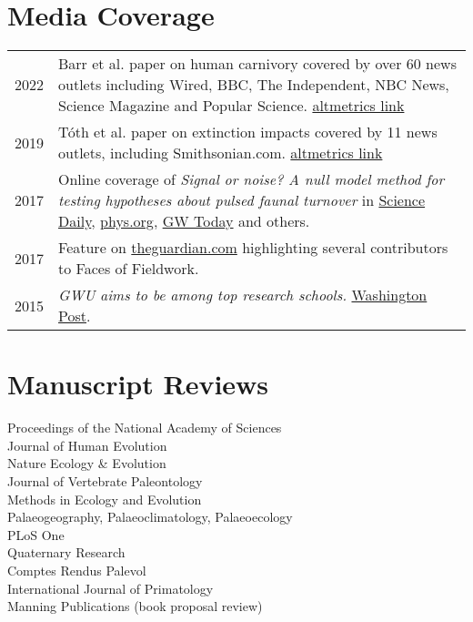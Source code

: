 \documentclass{article}
\begin{document}
\section*{Media Coverage}
\begin{longtable}{p{}p{}}
2022 & Barr et al. paper on human carnivory covered by over 60 news outlets including Wired, BBC, The Independent, NBC News, Science Magazine and Popular Science. \href{https://www.altmetric.com/details/121513529/news}{altmetrics link}\\[4pt]
2019 & Tóth et al. paper on extinction impacts covered by 11 news outlets, including Smithsonian.com. \href{https://www.altmetric.com/details/66845562/news}{altmetrics link}\\[4pt]
2017 &  Online coverage of \emph{Signal or noise? A null model method for testing hypotheses about pulsed faunal turnover} in \href{https://www.sciencedaily.com/releases/2017/08/170804100410.htm}{Science Daily}, \href{https://phys.org/news/2017-08-paper-genus-homo-response-environmental.html}{phys.org}, \href{https://gwtoday.gwu.edu/origin-human-genus-may-have-occurred-chance}{GW Today} and others. \\[4pt]
2017 & Feature on \href{https://www.theguardian.com/lifeandstyle/2017/jul/01/pregnant-in-the-field-blog-photography-have-trowel-will-travel}{theguardian.com} highlighting several contributors to Faces of Fieldwork.\\[4pt]
2015 & \emph{GWU aims to be among top research schools.} \href{http://www.washingtonpost.com/local/education/gwu-aims-to-be-among-top-research-schools/2015/03/03/491da24e-c1f1-11e4-9ec2-b418f57a4a99_gallery.html}{Washington Post}.\\
\end{longtable}

\section*{Manuscript Reviews}
Proceedings of the National Academy of Sciences\\[4pt]
Journal of Human Evolution\\[4pt]
Nature Ecology \& Evolution\\[4pt]
Journal of Vertebrate Paleontology\\[4pt]
Methods in Ecology and Evolution\\[4pt]
Palaeogeography, Palaeoclimatology, Palaeoecology\\[4pt]
PLoS One\\[4pt]
Quaternary Research\\[4pt]
Comptes Rendus Palevol\\[4pt]
International Journal of Primatology\\[4pt]
Manning Publications (book proposal review)\\
\end{document}
